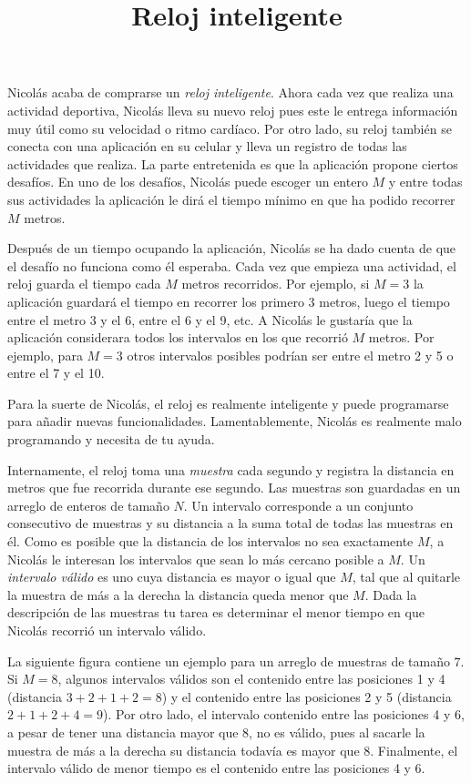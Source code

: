 \documentclass{oci}
\title{Reloj inteligente}
\begin{document}
\begin{problemDescription}
  Nicolás acaba de comprarse un \emph{reloj inteligente}.
  Ahora cada vez que realiza una actividad deportiva, Nicolás lleva su nuevo
  reloj pues este le entrega información muy útil como su velocidad o ritmo
  cardíaco.
  Por otro lado, su reloj también se conecta con una aplicación en su celular y
  lleva un registro de todas las actividades que realiza.
  La parte entretenida es que la aplicación propone ciertos desafíos.
  En uno de los desafíos, Nicolás puede escoger un entero $M$ y entre todas sus
  actividades la aplicación le dirá el tiempo mínimo en que ha podido recorrer
  $M$ metros.

  Después de un tiempo ocupando la aplicación, Nicolás se ha dado cuenta de que el
  desafío no funciona como él esperaba.
  Cada vez que empieza una actividad, el reloj guarda el tiempo cada $M$
  metros recorridos.
  Por ejemplo, si $M=3$ la aplicación guardará el tiempo en
  recorrer los primero 3 metros, luego el tiempo entre el metro 3 y
  el 6, entre el 6 y el 9, etc.
  A Nicolás le gustaría que la aplicación considerara todos los intervalos en
  los que recorrió $M$ metros.
  Por ejemplo, para $M=3$ otros intervalos posibles podrían ser entre el
  metro 2 y 5 o entre el 7 y el 10.

  Para la suerte de Nicolás, el reloj es realmente inteligente y puede
  programarse para añadir nuevas funcionalidades.
  Lamentablemente, Nicolás es realmente malo programando y necesita de tu ayuda.

  Internamente, el reloj toma una \emph{muestra} cada segundo y registra la
  distancia en metros que fue recorrida durante ese segundo.
  Las muestras son guardadas en un arreglo de enteros de tamaño $N$.
  Un intervalo corresponde a un conjunto consecutivo de muestras y su distancia
  a la suma total de todas las muestras en él.
  Como es posible que la distancia de los intervalos no sea exactamente $M$,
  a Nicolás le interesan los intervalos que sean lo más cercano posible a $M$.
  Un \emph{intervalo válido} es uno cuya distancia es mayor o igual que $M$,
  tal que al quitarle la muestra de más a la derecha la distancia queda menor
  que $M$.
  Dada la descripción de las muestras tu tarea es determinar el menor tiempo en
  que Nicolás recorrió un intervalo válido.

  La siguiente figura contiene un ejemplo para un arreglo de muestras de tamaño
  $7$.
  Si $M=8$, algunos intervalos válidos son el contenido entre las posiciones 1 y
  4 (distancia $3+2+1+2=8$) y el contenido entre las posiciones 2 y 5 (distancia
  $2+1+2+4=9$).
  Por otro lado, el intervalo contenido entre las posiciones 4 y 6, a pesar de
  tener una distancia mayor que 8, no es válido, pues al sacarle la muestra de más
  a la derecha su distancia todavía es mayor que 8.
  Finalmente, el intervalo válido de menor tiempo es el contenido entre las
  posiciones 4 y 6.


\end{problemDescription}
\end{document}
